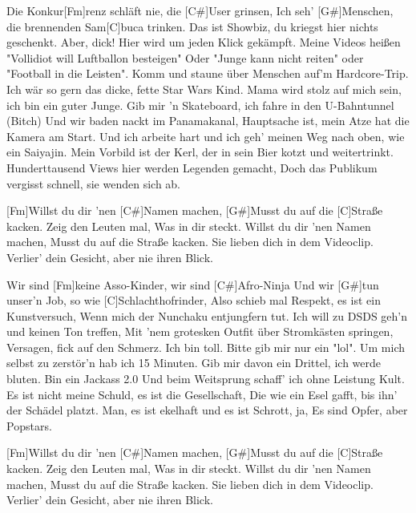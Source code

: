 

\begin{guitar}
	Die Konkur[Fm]renz schläft nie, die [C#]User grinsen,
	Ich seh' [G#]Menschen, die brennenden Sam[C]buca trinken.
	Das ist Showbiz, du kriegst hier nichts geschenkt.
	Aber, dick! Hier wird um jeden Klick gekämpft.
	Meine Videos heißen "Vollidiot will Luftballon besteigen"
	Oder "Junge kann nicht reiten" oder "Football in die Leisten".
	Komm und staune über Menschen auf'm Hardcore-Trip.
	Ich wär so gern das dicke, fette Star Wars Kind.
	Mama wird stolz auf mich sein, ich bin ein guter Junge.
	Gib mir 'n Skateboard, ich fahre in den U-Bahntunnel (Bitch)
	Und wir baden nackt im Panamakanal,
	Hauptsache ist, mein Atze hat die Kamera am Start.
	Und ich arbeite hart und ich geh' meinen Weg nach oben, wie ein Saiyajin.
	Mein Vorbild ist der Kerl, der in sein Bier kotzt und weitertrinkt.
	Hunderttausend Views hier werden Legenden gemacht,
	Doch das Publikum vergisst schnell, sie wenden sich ab.
	
	\begin{highlightbar}
		[Fm]Willst du dir 'nen [C#]Namen machen,
		[G#]Musst du auf die [C]Straße kacken.
		Zeig den Leuten mal,
		Was in dir steckt.
		Willst du dir 'nen Namen machen,
		Musst du auf die Straße kacken.
		Sie lieben dich in dem Videoclip.
		Verlier' dein Gesicht, aber nie ihren Blick.
	\end{highlightbar}
	\pagebreak
	\songsection{Strophe 2}
	Wir sind [Fm]keine Asso-Kinder, wir sind [C#]Afro-Ninja
	Und wir [G#]tun unser'n Job, so wie [C]Schlachthofrinder,
	Also schieb mal Respekt, es ist ein Kunstversuch,
	Wenn mich der Nunchaku entjungfern tut.
	Ich will zu DSDS geh'n und keinen Ton treffen,
	Mit 'nem grotesken Outfit über Stromkästen springen,
	Versagen, fick auf den Schmerz. Ich bin toll.
	Bitte gib mir nur ein "lol".
	Um mich selbst zu zerstör'n hab ich 15 Minuten.
	Gib mir davon ein Drittel, ich werde bluten.
	Bin ein Jackass 2.0
	Und beim Weitsprung schaff' ich ohne Leistung Kult.
	Es ist nicht meine Schuld, es ist die Gesellschaft,
	Die wie ein Esel gafft, bis ihn' der Schädel platzt.
	Man, es ist ekelhaft und es ist Schrott, ja,
	Es sind Opfer, aber Popstars.
	
	\begin{highlightbar}
		\songsection{Refrain}
		[Fm]Willst du dir 'nen [C#]Namen machen,
		[G#]Musst du auf die [C]Straße kacken.
		Zeig den Leuten mal,
		Was in dir steckt.
		Willst du dir 'nen Namen machen,
		Musst du auf die Straße kacken.
		Sie lieben dich in dem Videoclip.
		Verlier' dein Gesicht, aber nie ihren Blick.
	\end{highlightbar}
\end{guitar}